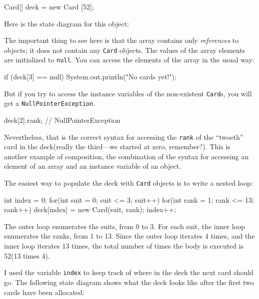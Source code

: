 \documentclass{book}
\begin{document}
\begin{verbatimtab}
    Card[] deck = new Card [52];
\end{verbatimtab}

Here is the state diagram for this object:



The important thing to see here is that the array contains
only {\em references} to objects; it does not contain any
{\tt Card} objects.  The values of the array elements are
initialized to {\tt null}.  You can access the elements of
the array in the usual way:

\begin{verbatimtab}
    if (deck[3] == null) {
        System.out.println("No cards yet!");
    }
\end{verbatimtab}
%
But if you try to access the instance variables of the
non-existent {\tt Card}s, you will get a {\tt NullPointerException}.


\begin{verbatimtab}
    deck[2].rank;             // NullPointerException
\end{verbatimtab}
%
Nevertheless, that is the correct syntax for accessing the {\tt rank}
of the ``twoeth'' card in the deck(really the third---we started
at zero, remember?).  This is another example of composition, the
combination of the syntax for accessing an element of an array
and an instance variable of an object.


The easiest way to populate the deck with {\tt Card} objects
is to write a nested loop:

\begin{verbatimtab}
    int index = 0;
    for(int suit = 0; suit <= 3; suit++) {
        for(int rank = 1; rank <= 13; rank++) {
            deck[index] = new Card(suit, rank);
            index++;
        }
    }
\end{verbatimtab}
%
The outer loop enumerates the suits, from 0 to 3.  For
each suit, the inner loop enumerates the ranks, from 1
to 13.  Since the outer loop iterates 4 times, and
the inner loop iterates 13 times, the total number of times
the body is executed is 52(13 times 4).


I used the variable {\tt index} to keep track of where in the
deck the next card should go.  The following state diagram
shows what the deck looks like after the first two cards
have been allocated:
\end{document}
